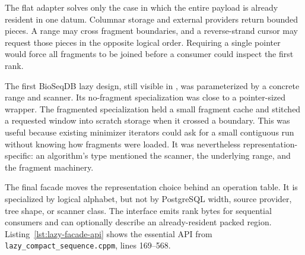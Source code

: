 The flat adapter solves only the case in which the entire payload is already
resident in one datum.  Columnar storage and external providers return bounded
pieces.  A range may cross fragment boundaries, and a reverse-strand cursor
may request those pieces in the opposite logical order.  Requiring a single
pointer would force all fragments to be joined before a consumer could inspect
the first rank.

The first \mbox{BioSeqDB} lazy design, still visible in
, was
parameterized by a concrete range and scanner.  Its no-fragment specialization
was close to a pointer-sized wrapper.  The fragmented specialization held a
small fragment cache and stitched a requested window into scratch storage when
it crossed a boundary.  This was useful because existing minimizer iterators
could ask for a small contiguous run without knowing how fragments were
loaded.  It was nevertheless representation-specific: an algorithm's type
mentioned the scanner, the underlying range, and the fragment machinery.

The final facade moves the representation choice behind an operation table.
It is specialized by logical alphabet, but not by PostgreSQL width, source
provider, tree shape, or scanner class.  The interface emits rank bytes for
sequential consumers and can optionally describe an already-resident packed
region.  Listing~\ref{lst:lazy-facade-api} shows the essential API from
\texttt{lazy\_compact\_sequence.cppm}, lines 169--568.

